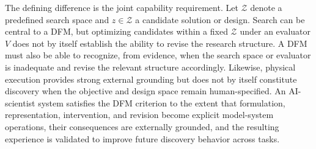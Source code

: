 \documentclass[11pt, a4paper, copyright]{google}
\begin{document}
The defining difference is the joint capability requirement. Let $\mathcal{Z}$ denote a predefined search space and $z\in\mathcal{Z}$ a candidate solution or design. Search can be central to a DFM, but optimizing candidates within a fixed $\mathcal{Z}$ under an evaluator $V$ does not by itself establish the ability to revise the research structure. A DFM must also be able to recognize, from evidence, when the search space or evaluator is inadequate and revise the relevant structure accordingly. Likewise, physical execution provides strong external grounding but does not by itself constitute discovery when the objective and design space remain human-specified. An AI-scientist system satisfies the DFM criterion to the extent that formulation, representation, intervention, and revision become explicit model-system operations, their consequences are externally grounded, and the resulting experience is validated to improve future discovery behavior across tasks.
\end{document}
